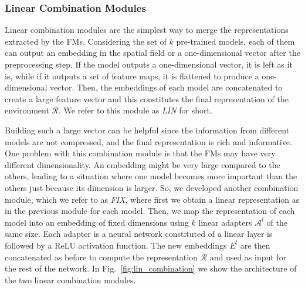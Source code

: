 \subsubsection{Linear Combination Modules}\label{subsubsec:linear_combination}
Linear combination modules are the simplest way to merge the representations extracted by the FMs.
Considering the set of $k$ pre-trained models, each of them can output an embedding in the spatial field or a one-dimensional vector after the preprocessing step.
If the model outputs a one-dimensional vector, it is left as it is, while if it outputs a set of feature maps, it is flattened to produce a one-dimensional vector.
Then, the embeddings of each model are concatenated to create a large feature vector and this constitutes the final representation of the environment $\mathcal{R}$.
We refer to this module as \textit{LIN} for short.

Building such a large vector can be helpful since the information from different models are not compressed, and the final representation is rich and informative.
One problem with this combination module is that the FMs may have very different dimensionality.
An embedding might be very large compared to the others, leading to a situation where one model becomes more important than the others just because its dimension is larger.
So, we developed another combination module, which we refer to as \textit{FIX}, where first we obtain a linear representation as in the previous module for each model.
Then, we map the representation of each model into an embedding of fixed dimensions using $k$ linear adapters $\mathcal{A}^{l}$ of the same size.
Each adapter is a neural network constituted of a linear layer is followed by a ReLU activation function.
The new embeddings $E^{l}$ are then concatenated as before to compute the representation $\mathcal{R}$ and used as input for the rest of the network.
In Fig.~\ref{fig:lin_combination} we show the architecture of the two linear combination modules.



